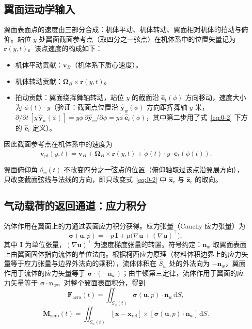 \documentclass[11pt,a4paper]{ctexart}
\numberwithin{equation}{section}
\begin{document}
\subsection{翼面运动学输入}

翼面表面点的速度由三部分合成：机体平动、机体转动、翼面相对机体的拍动与俯仰。站位 $y$ 处翼面截面参考点（取四分之一弦点）在机体系中的位置矢量记为 $\bm{r}(y, t)$。该点速度的构成如下：

\begin{itemize}
  \item 机体平动贡献：$\bm{v}_B$（机体系下质心速度）。
  \item 机体转动贡献：$\bm{\Omega}_B \times \bm{r}(y, t)$。
  \item 拍动贡献：翼面绕挥舞轴转动，站位 $y$ 的截面沿 $\hat{\bm{e}}_t(\phi)$ 方向移动，速度大小为 $\dot{\phi}(t)\cdot y$（验证：截面点位置沿 $\hat{\bm{y}}_w(\phi)$ 方向距挥舞轴 $y$ 米，$\partial/\partial t\,[y\,\hat{\bm{y}}_w(\phi)] = y\dot{\phi}\,\partial\hat{\bm{y}}_w/\partial\phi = y\dot{\phi}\,\hat{\bm{e}}_t(\phi)$，其中第二步用了式~\eqref{eq:0-2} 下方的 $\hat{\bm{e}}_t$ 定义）。
\end{itemize}

因此截面参考点在机体系中的速度为
\begin{equation}
  \bm{v}_{pt}(y, t) = \bm{v}_B + \bm{\Omega}_B \times \bm{r}(y, t) + \dot{\phi}(t)\cdot y\cdot\hat{\bm{e}}_t(\phi(t)). \label{eq:1-5}
\end{equation}

翼面俯仰角 $\theta_w(t)$ 不改变四分之一弦点的位置（俯仰轴取过该点沿翼展方向），只改变截面弦线与法线的方向，即只改变式~\eqref{eq:0-2} 中 $\hat{\bm{x}}_c$ 与 $\hat{\bm{z}}_c$ 的取向。

\subsection{气动载荷的返回通道：应力积分}

流体作用在翼面上的力通过表面应力积分获得。应力张量（Cauchy 应力张量）为
\begin{equation}
  \bm{\sigma}(\bm{u}, p) = -p\,\bm{I} + \mu\bigl(\nabla\bm{u} + (\nabla\bm{u})^{\top}\bigr), \label{eq:1-6}
\end{equation}
其中 $\bm{I}$ 为单位张量，$(\nabla\bm{u})^{\top}$ 为速度梯度张量的转置。符号约定：$\bm{n}_w$ 取翼面表面上由翼面固体指向流体的单位法向。根据柯西应力原理（材料体积边界上的应力矢量等于应力张量与边界外法向的乘积），流体体积在 $\hat{S}_w$ 处的外法向为 $-\bm{n}_w$，翼面作用于流体的应力矢量等于 $\bm{\sigma}\cdot(-\bm{n}_w)$；由牛顿第三定律，流体作用于翼面的应力矢量等于 $\bm{\sigma}\cdot\bm{n}_w$。对整个翼面表面积分，得到
\begin{equation}
  \bm{F}_{\text{aero}}(t) = \iint_{S_w(t)} \bm{\sigma}(\bm{u}, p)\cdot\bm{n}_w\,\mathrm{d}S, \label{eq:1-7}
\end{equation}
\begin{equation}
  \bm{M}_{\text{aero}}(t) = \iint_{S_w(t)} [\bm{x} - \bm{x}_{\text{ref}}] \times [\bm{\sigma}(\bm{u}, p)\cdot\bm{n}_w]\,\mathrm{d}S. \label{eq:1-8}
\end{equation}
\end{document}

